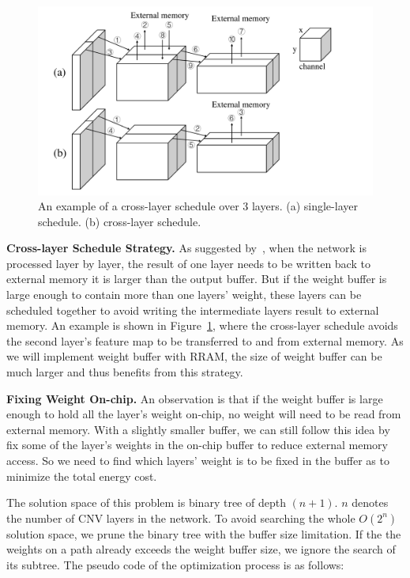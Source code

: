 \begin{figure}[t]
  \centering
  \includegraphics[width=1\columnwidth]{fig/cross_layer.pdf}
  \vspace{-20pt}
  \caption{An example of a cross-layer schedule over 3 layers. (a) single-layer schedule. (b) cross-layer schedule.}
  \label{fig:cross_layer}
  \vspace{-5pt}
\end{figure}

{\bf{Cross-layer Schedule Strategy}.} As suggested by~\cite{alwani2016fused}, when the network is processed layer by layer, the result of one layer needs to be written back to external memory it is larger than the output buffer. But if the weight buffer is large enough to contain more than one layers' weight, these layers can be scheduled together to avoid writing the intermediate layers result to external memory. An example is shown in Figure~\ref{fig:cross_layer}, where the cross-layer schedule avoids the second layer's feature map to be transferred to and from external memory. As we will implement weight buffer with RRAM, the size of weight buffer can be much larger and thus benefits from this strategy.

{\bf{Fixing Weight On-chip}.} An observation is that if the weight buffer is large enough to hold all the layer's weight on-chip, no weight will need to be read from external memory. With a slightly smaller buffer, we can still follow this idea by fix some of the layer's weights in the on-chip buffer to reduce external memory access. So we need to find which layers' weight is to be fixed in the buffer as to minimize the total energy cost.

The solution space of this problem is binary tree of depth $(n+1)$. $n$ denotes the number of CNV layers in the network. To avoid searching the whole $O(2^n)$ solution space, we prune the binary tree with the buffer size limitation. If the the weights on a path already exceeds the weight buffer size, we ignore the search of its subtree. The pseudo code of the optimization process is as follows:

